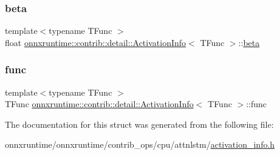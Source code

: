\mbox{\label{structonnxruntime_1_1contrib_1_1detail_1_1ActivationInfo_a2a26b84c28ddf7bb4dee73320f4187a1}} 
\subsubsection{\texorpdfstring{beta}{beta}}
{\footnotesize\ttfamily template$<$typename T\+Func $>$ \\
float \mbox{\hyperlink{structonnxruntime_1_1contrib_1_1detail_1_1ActivationInfo}{onnxruntime\+::contrib\+::detail\+::\+Activation\+Info}}$<$ T\+Func $>$\+::\mbox{\hyperlink{mlasi_8h_a5fd37d216981b4cd9a19e29b5acd48d4}{beta}}}

\mbox{\label{structonnxruntime_1_1contrib_1_1detail_1_1ActivationInfo_aba5100763dcc95a3bfb9708fb169de40}} 
\subsubsection{\texorpdfstring{func}{func}}
{\footnotesize\ttfamily template$<$typename T\+Func $>$ \\
T\+Func \mbox{\hyperlink{structonnxruntime_1_1contrib_1_1detail_1_1ActivationInfo}{onnxruntime\+::contrib\+::detail\+::\+Activation\+Info}}$<$ T\+Func $>$\+::func}



The documentation for this struct was generated from the following file\+:\begin{DoxyCompactItemize}
\item 
onnxruntime/onnxruntime/contrib\+\_\+ops/cpu/attnlstm/\mbox{\hyperlink{activation__info_8h}{activation\+\_\+info.\+h}}\end{DoxyCompactItemize}
